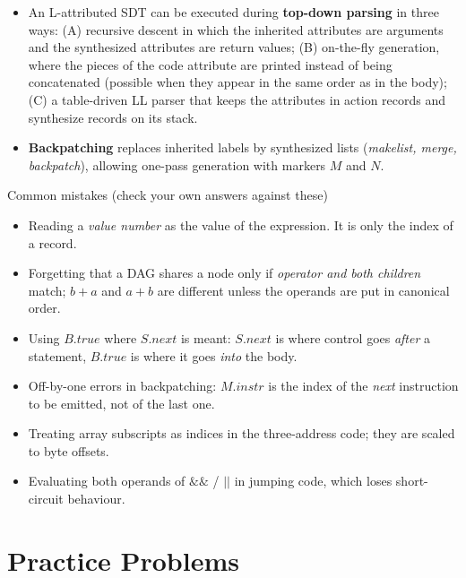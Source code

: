 \documentclass[11pt,a4paper]{article}
\begin{document}
\begin{itemize}
\item An L-attributed SDT can be executed during \textbf{top-down parsing} in three ways: (A) recursive descent in which the inherited attributes are arguments and the synthesized attributes are return values; (B) on-the-fly generation, where the pieces of the code attribute are printed instead of being concatenated (possible when they appear in the same order as in the body); (C) a table-driven LL parser that keeps the attributes in action records and synthesize records on its stack.
\item \textbf{Backpatching} replaces inherited labels by synthesized lists (\textit{makelist, merge, backpatch}), allowing one-pass generation with markers $M$ and $N$.
\end{itemize}

\begin{pitfallbox}{Common mistakes (check your own answers against these)}
\begin{itemize}[nosep]
\item Reading a \emph{value number} as the value of the expression. It is only the index of a record.
\item Forgetting that a DAG shares a node only if \emph{operator and both children} match; $b+a$ and $a+b$ are different unless the operands are put in canonical order.
\item Using $B.true$ where $S.next$ is meant: $S.next$ is where control goes \emph{after} a statement, $B.true$ is where it goes \emph{into} the body.
\item Off-by-one errors in backpatching: $M.instr$ is the index of the \emph{next} instruction to be emitted, not of the last one.
\item Treating array subscripts as indices in the three-address code; they are scaled to byte offsets.
\item Evaluating both operands of $\&\&$ / $||$ in jumping code, which loses short-circuit behaviour.
\end{itemize}
\end{pitfallbox}

\section{Practice Problems}
\end{document}
